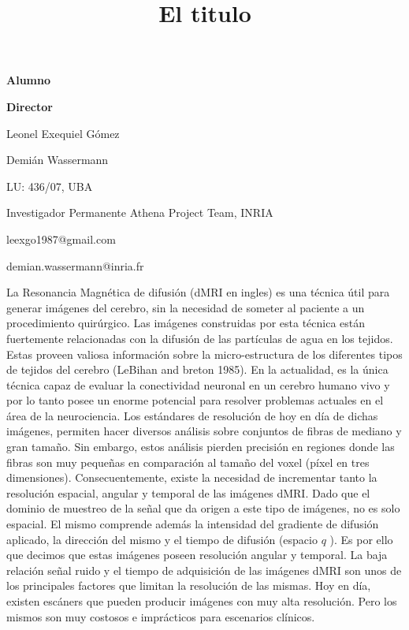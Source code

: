 \documentclass[a4paper,10pt]{article}
\title{El titulo}
\newcommand\textline[3][t]{%
  \par\smallskip\noindent\parbox[#1]{.333\textwidth}
  {\raggedright#3}%
  \parbox[#1]{.658\textwidth}{\raggedleft#2}%
}
\begin{document}
{
\textline[t]{\textbf{Director}}{\textbf{Alumno}}
\textline[t]{Demián Wassermann}{Leonel Exequiel G\'omez}
\textline[t]{Investigador Permanente Athena Project Team, INRIA}{LU: 436/07, UBA}
\textline[t]{demian.wassermann@inria.fr}{leexgo1987@gmail.com}
}





\vspace{2cm}


La Resonancia Magnética de difusión (dMRI en ingles) es una técnica útil para generar imágenes del 
cerebro, sin la necesidad de someter al paciente a un procedimiento quirúrgico. Las imágenes 
construidas por esta técnica están fuertemente relacionadas con la difusión de las partículas de agua en los tejidos. 
Estas proveen valiosa información sobre la micro-estructura de los diferentes tipos de tejidos del cerebro 
(LeBihan and breton 1985). En la actualidad, es la única técnica capaz de evaluar 
la conectividad neuronal en un cerebro humano vivo y por lo tanto posee un enorme potencial para resolver problemas 
actuales en el área de la neurociencia. Los estándares de resolución de hoy en día de dichas imágenes, permiten hacer 
diversos análisis sobre conjuntos de fibras de mediano y gran tamaño. Sin embargo, estos análisis 
pierden precisión en regiones donde las fibras son muy pequeñas en comparación al tamaño del voxel (píxel en tres 
dimensiones). Consecuentemente, existe la necesidad de incrementar tanto la resolución espacial, angular y temporal de 
las imágenes dMRI. Dado que el dominio de muestreo de la señal que da origen a este tipo de imágenes, no es solo 
espacial. El mismo comprende además la intensidad del gradiente de difusión aplicado, la dirección del mismo y el 
tiempo de difusión (espacio $q$ \citep{CALLAGHAN1990177}). Es por ello que decimos que estas imágenes poseen resolución 
angular y temporal. La baja relaci\'on se\~nal ruido y el tiempo de adquisici\'on de las imágenes dMRI son unos de los 
principales factores que limitan la resolución de las mismas. %
Hoy en día, existen escáners que pueden 
producir imágenes con muy alta resolución. Pero los mismos son muy costosos e 
imprácticos para escenarios clínicos.
\end{document}

